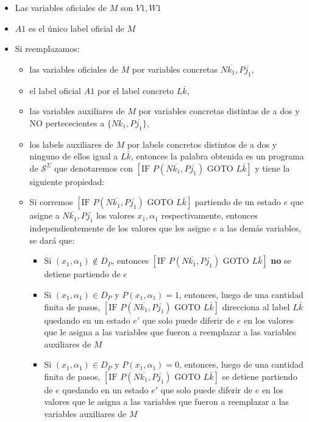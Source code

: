 \documentclass[
]{article}
\providecommand{\tightlist}{%
  \setlength{\itemsep}{0pt}\setlength{\parskip}{0pt}}
\begin{document}
\begin{itemize}
\tightlist
\item
  Las variables oficiales de \(M\) son \(V1,W1\)
\item
  \(A1\) es el único label oficial de \(M\)
\item
  Si reemplazamos:

  \begin{itemize}
  \tightlist
  \item
    las variables oficiales de \(M\) por variables concretas
    \(N\overline{k_1},P\overline{j_1}\),
  \item
    el label oficial \(A1\) por el label concreto \(L\bar{k}\),
  \item
    las variables auxiliares de \(M\) por variables concretas distintas
    de a dos y NO pertececientes a
    \(\{N\overline{k_1},P\overline{j_1}\}\),
  \item
    los labels auxiliares de \(M\) por labels concretos distintos de a
    dos y ninguno de ellos igual a \(L\bar{k}\), entonces la palabra
    obtenida es un programa de \(\mathcal{S}^\Sigma\) que denotaremos
    con
    \([\text{IF }P(N\overline{k_1},P\overline{j_1})\text{ GOTO }L\bar{k}]\)
    y tiene la siguiente propiedad:
  \item
    Si corremos
    \([\text{IF }P(N\overline{k_1},P\overline{j_1})\text{ GOTO }L\bar{k}]\)
    partiendo de un estado \(e\) que asigne a
    \(N\overline{k_1}, P\overline{j_1}\) los valores \(x_1, \alpha_1\)
    respectivamente, entonces independientemente de los valores que les
    asigne \(e\) a las demás variables, se dará que:

    \begin{itemize}
    \tightlist
    \item
      Si \((x_1, \alpha_1)\notin D_P\), entonces
      \([\text{IF }P(N\overline{k_1},P\overline{j_1})\text{ GOTO }L\bar{k}]\)
      \textbf{no} se detiene partiendo de \(e\)
    \item
      Si \((x_1, \alpha_1)\in D_P\) y \(P(x_1, \alpha_1)=1\), entonces,
      luego de una cantidad finita de pasos,
      \([\text{IF }P(N\overline{k_1},P\overline{j_1})\text{ GOTO }L\bar{k}]\)
      direcciona al label \(L\bar{k}\) quedando en un estado \(e'\) que
      solo puede diferir de \(e\) en los valores que le asigna a las
      variables que fueron a reemplazar a las variables auxiliares de
      \(M\)
    \item
      Si \((x_1, \alpha_1)\in D_P\) y \(P(x_1, \alpha_1)=0\), entonces,
      luego de una cantidad finita de pasos,
      \([\text{IF }P(N\overline{k_1},P\overline{j_1})\text{ GOTO }L\bar{k}]\)
      se detiene partiendo de \(e\) quedando en un estado \(e'\) que
      solo puede diferir de \(e\) en los valores que le asigna a las
      variables que fueron a reemplazar a las variables auxiliares de
      \(M\)
    \end{itemize}
  \end{itemize}
\end{itemize}
\end{document}
